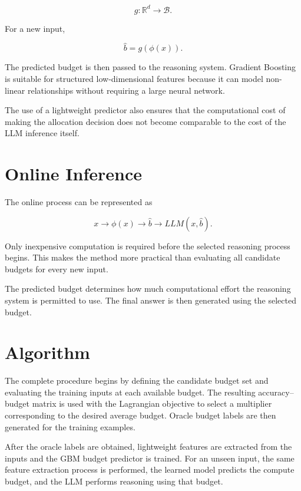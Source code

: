 \documentclass[12pt,a4paper,titlepage]{report}
\begin{document}
\begin{equation}
g:\mathbb{R}^{d}\rightarrow\mathcal{B}.
\end{equation}

For a new input,

\begin{equation}
\hat{b}=g(\phi(x)).
\end{equation}

The predicted budget is then passed to the reasoning system. Gradient Boosting is suitable for structured low-dimensional features because it can model non-linear relationships without requiring a large neural network.

The use of a lightweight predictor also ensures that the computational cost of making the allocation decision does not become comparable to the cost of the LLM inference itself.

\section{Online Inference}

The online process can be represented as

\begin{equation}
x
\rightarrow
\phi(x)
\rightarrow
\hat{b}
\rightarrow
LLM(x,\hat{b}).
\end{equation}

Only inexpensive computation is required before the selected reasoning process begins. This makes the method more practical than evaluating all candidate budgets for every new input.

The predicted budget determines how much computational effort the reasoning system is permitted to use. The final answer is then generated using the selected budget.

\section{Algorithm}

The complete procedure begins by defining the candidate budget set and evaluating the training inputs at each available budget. The resulting accuracy--budget matrix is used with the Lagrangian objective to select a multiplier corresponding to the desired average budget. Oracle budget labels are then generated for the training examples.

After the oracle labels are obtained, lightweight features are extracted from the inputs and the GBM budget predictor is trained. For an unseen input, the same feature extraction process is performed, the learned model predicts the compute budget, and the LLM performs reasoning using that budget.
\end{document}

